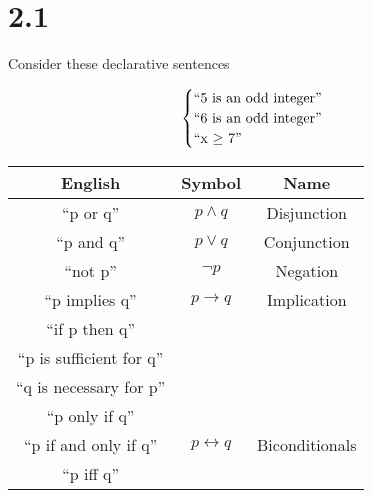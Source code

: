 \documentclass{article}
\begin{document}
\section*{2.1}

Consider these declarative sentences

\[
\begin{cases}
  $``5 is an odd integer''$ \\
  $``6 is an odd integer''$ \\
  $``x $\ge$ 7''$
\end{cases}
\]

\begin{tabular}{c|c|c}
English & Symbol & Name \\
\hline
``p or q'' & $p \wedge q$ & Disjunction \\
\hline
``p and q'' & $p \vee q$ & Conjunction \\
\hline
``not p'' & $\neg p$ & Negation \\
\hline
``p implies q'' & $p \rightarrow q$ & Implication \\
``if p then q'' \\
``p is sufficient for q'' \\
``q is necessary for p'' \\
``p only if q'' \\
\hline
``p if and only if q'' & $p \leftrightarrow q$ & Biconditionals \\
``p iff q''
\end{tabular}
\end{document}
